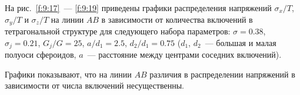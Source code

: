 На рис.~\ref{f:9:17}~--- \ref{f:9:19} приведены графики распределения напряжений $\sigma_x/T$, $\sigma_y/T$ и $\sigma_z/T$ на линии $AB$ в зависимости от количества включений в тетрагональной структуре для следующего набора параметров: $\sigma=0.38$, $\sigma_j=0.21$, $G_j/G=25$, $a/d_1=2.5$, $d_2/d_1=0.75$ ($d_1$, $d_2$~--- большая и малая полуоси сфероидов, $a$~--- расстояние между центрами соседних включений).

Графики показывают, что на линии $AB$ различия в распределении напряжений в зависимости от числа включений несущественны.

%



